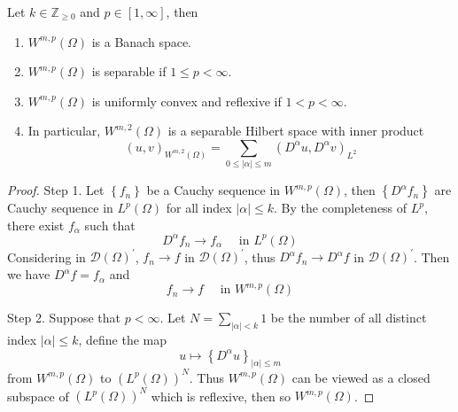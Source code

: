 \begin{theorem}
    Let $k\in \mathbb{Z}_{\geq 0}$ and $p\in \left[1,\infty\right]$, then
    \begin{enumerate}
        \item
              $W^{m,p}\left(\Omega\right)$ is a Banach space.
        \item
              $W^{m,p}\left(\Omega\right)$ is separable if $1\leq p< \infty$.
        \item  $W^{m,p}\left(\Omega\right)$ is uniformly convex and reflexive if $1 < p <\infty$.
        \item
              In particular, \(W^{m,2}\left(\Omega\right)\) is a separable Hilbert space with inner product
              \begin{equation}
                  (u, v)_{W^{m,2}\left(\Omega\right)} = \sum_{0 \leq \left| \alpha \right| \leq m} \left( D^{\alpha} u, D^{\alpha} v \right)_{L^2}
              \end{equation}
    \end{enumerate}
    \begin{proof}
        Step 1.
        Let $\left\{f_n\right\}$ be a Cauchy sequence in $W^{m,p}\left(\Omega\right)$, then $\left\{D^\alpha f_n\right\}$ are Cauchy sequence in $L^p\left(\Omega\right)$ for all index $\left|\alpha\right| \leq k$.
        By the completeness of $L^p$, there exist $f_\alpha$ such that
        \begin{equation*}
            D^\alpha f_n \rightarrow f_\alpha \quad \text{ in } L^p\left(\Omega\right)
        \end{equation*}
        Considering in $\mathscr{D}\left(\Omega\right)^\prime$, $f_n\rightarrow f$ in $\mathscr{D}\left(\Omega\right)^\prime$, thus $D^\alpha f_n\rightarrow D^\alpha f$ in $\mathscr{D}\left(\Omega\right)^\prime$. Then we have $D^\alpha f=f_\alpha$ and
        \begin{equation*}
            f_n \rightarrow f \quad \text{ in } W^{m,p}\left(\Omega\right)
        \end{equation*}


        Step 2. Suppose that $p< \infty$.
        Let $N=\sum_{\left|\alpha\right|<k} 1$ be the number of all distinct index $\left|\alpha\right| \leq k$, define the map
        \begin{equation*}
            u\mapsto \left\{D^\alpha u\right\}_{\left|\alpha\right|\leq m}
        \end{equation*}
        from $W^{m,p}\left(\Omega\right)$ to $\left(L^p\left(\Omega\right)\right)^N$. Thus $W^{m,p}\left(\Omega\right)$ can be viewed as a closed subspace of $\left(L^p\left(\Omega\right)\right)^N$ which is reflexive, then so $W^{m,p}\left(\Omega\right)$.
    \end{proof}
\end{theorem}



